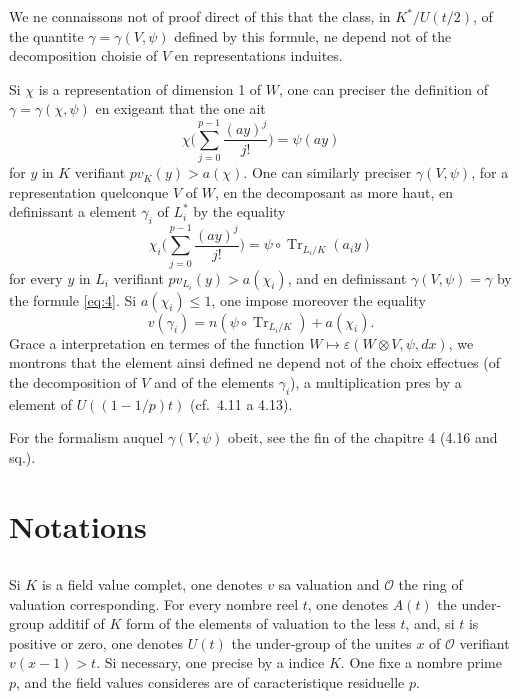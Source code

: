 \documentclass[12pt,a4paper]{article}
\theoremstyle{plain}
\theoremstyle{definition}
\theoremstyle{remark}
\DeclareMathOperator{\Tr}{Tr}
\newcommand{\cO}{\mathcal{O}}
\providecommand{\cO}{\mathcal{O}}
\providecommand{\Tr}{\operatorname{Tr}}
\begin{document}
We ne connaissons not of proof direct of this that the class, in $K^*/U(t/2)$, of the quantite $\gamma = \gamma(V, \psi)$ defined by this formule, ne depend not of the decomposition choisie of $V$ en representations induites.

Si $\chi$ is a representation of dimension 1 of $W$, one can preciser the definition of $\gamma = \gamma(\chi, \psi)$ en exigeant that the one ait
\[
\chi\biggl(\sum_{j=0}^{p-1} \frac{(ay)^j}{j!}\biggr) = \psi(ay)
\]
for $y$ in $K$ verifiant $pv_K(y) > a(\chi)$. One can similarly preciser $\gamma(V, \psi)$, for a representation quelconque $V$ of $W$, en the decomposant as more haut, en definissant a element $\gamma_i$ of $L_i^*$ by the equality
\[
\chi_i\biggl(\sum_{j=0}^{p-1} \frac{(ay)^j}{j!}\biggr) = \psi \circ \Tr_{L_i/K}(a_i y)
\]
for every $y$ in $L_i$ verifiant $pv_{L_i}(y) > a(\chi_i)$, and en definissant $\gamma(V, \psi) = \gamma$ by the formule \eqref{eq:4}. Si $a(\chi_i) \leq 1$, one impose moreover the equality
\[
v(\gamma_i) = n(\psi \circ \Tr_{L_i/K}) + a(\chi_i).
\]
Grace a interpretation en termes of the function $W \mapsto \varepsilon(W \otimes V, \psi, dx)$, we montrons that the element ainsi defined ne depend not of the choix effectues (of the decomposition of $V$ and of the elements $\gamma_i$), a multiplication pres by a element of $U((1-1/p)t)$ (cf.~4.11 a 4.13).

For the formalism auquel $\gamma(V, \psi)$ obeit, see the fin of the chapitre 4 (4.16 and sq.).


\section{Notations}
\label{sec:0}

\setcounter{subsection}{-1}

\subsection{}
\label{sec:0.1}

Si $K$ is a field value complet, one denotes $v$ sa valuation and $\cO$ the ring of valuation corresponding. For every nombre reel $t$, one denotes $A(t)$ the under-group additif of $K$ form of the elements of valuation to the less $t$, and, si $t$ is positive or zero, one denotes $U(t)$ the under-group of the unites $x$ of $\cO$ verifiant $v(x-1) > t$. Si necessary, one precise by a indice $K$. One fixe a nombre prime $p$, and the field values consideres are of caracteristique residuelle $p$.
\end{document}
